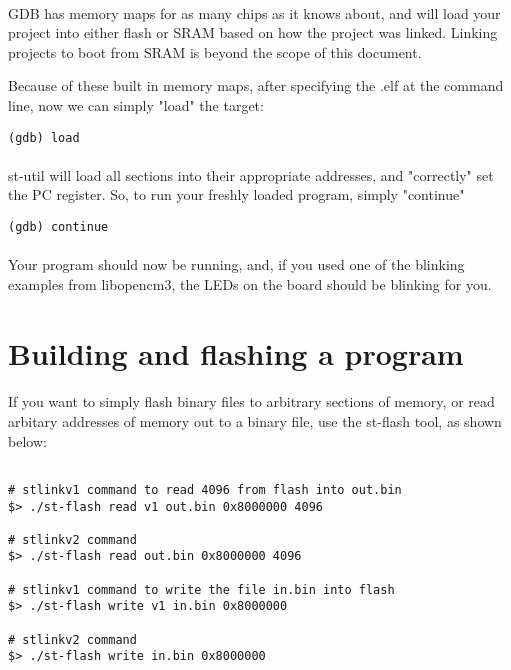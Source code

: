 \documentclass[a4paper, 11pt]{article}
\begin{document}
\paragraph{}
GDB has memory maps for as many chips as it knows about, and will load your project
into either flash or SRAM based on how the project was linked.  Linking projects
to boot from SRAM is beyond the scope of this document.

Because of these built in memory maps, after specifying the .elf at the command line, now
we can simply "load" the target:\\
\begin{small}
\begin{lstlisting}[frame=tb]
(gdb) load
\end{lstlisting}
\end{small}

\paragraph{}
st-util will load all sections into their appropriate addresses, and "correctly" set the PC
register.  So, to run your freshly loaded program, simply "continue"\\
\begin{small}
\begin{lstlisting}[frame=tb]
(gdb) continue
\end{lstlisting}
\end{small}

\paragraph{}
Your program should now be running, and, if you used one of the blinking examples from
libopencm3, the LEDs on the board should be blinking for you.

\newpage
\section{Building and flashing a program}
\paragraph{}
If you want to simply flash binary files to arbitrary sections of memory, or
read arbitary addresses of memory out to a binary file, use the st-flash tool, 
as shown below:\\
\begin{small}
\begin{lstlisting}[frame=tb]

# stlinkv1 command to read 4096 from flash into out.bin
$> ./st-flash read v1 out.bin 0x8000000 4096

# stlinkv2 command
$> ./st-flash read out.bin 0x8000000 4096

# stlinkv1 command to write the file in.bin into flash
$> ./st-flash write v1 in.bin 0x8000000

# stlinkv2 command
$> ./st-flash write in.bin 0x8000000
\end{lstlisting}
\end{small}
\end{document}
